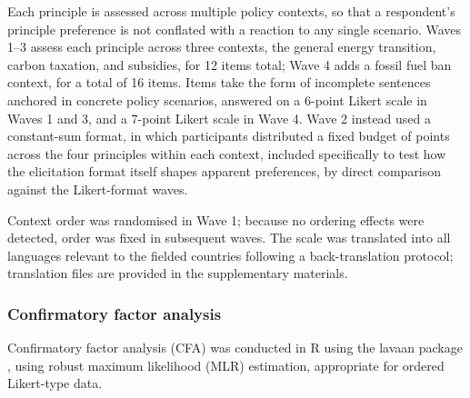 \documentclass[10pt,letterpaper]{article}
\begin{document}
Each principle is assessed across multiple policy contexts, so that a respondent's principle preference is not conflated with a reaction to any single scenario.
Waves 1–3 assess each principle across three contexts, the general energy transition, carbon taxation, and subsidies, for 12 items total; Wave 4 adds a fossil fuel ban context, for a total of 16 items.
Items take the form of incomplete sentences anchored in concrete policy scenarios, answered on a 6-point Likert scale in Waves 1 and 3, and a 7-point Likert scale in Wave 4.
Wave 2 instead used a constant-sum format, in which participants distributed a fixed budget of points across the four principles within each context, included specifically to test how the elicitation format itself shapes apparent preferences, by direct comparison against the Likert-format waves.

Context order was randomised in Wave 1; because no ordering effects were detected, order was fixed in subsequent waves.
The scale was translated into all languages relevant to the fielded countries following a back-translation protocol; translation files are provided in the supplementary materials.

\subsubsection*{Confirmatory factor analysis}
Confirmatory factor analysis (CFA) was conducted in R using the {lavaan} package \autocite{rosseel2012}, using robust maximum likelihood (MLR) estimation, appropriate for ordered Likert-type data.
\end{document}
